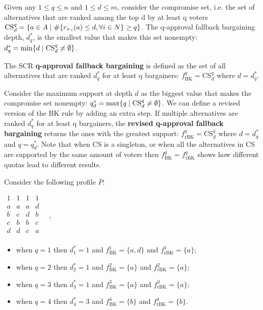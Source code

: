Given any $ 1 \leq q \leq n$ and $1 \leq d \leq m$, consider the compromise set, i.e. the set of alternatives that are ranked among the top d by at least q voters $\text{CS}^{q}_{d}=\{a \in A \suchthat \#\{r_{\prefi}(a) \leq d, \forall i \in N\} \geq q \}$.
The q-approval fallback bargaining depth, $d_{q}^{*}$, is the smallest value that makes this set nonempty: $d_{q}^{*}=\min\{d \suchthat \text{CS}^{q}_{d} \neq \emptyset\}$.

The \acs{SCR} \textbf{q-approval fallback bargaining} is defined as the set of all alternatives that are ranked $d_{q}^{*}$ for at least q bargainers: $f_{\text{BK}}^{q}=\text{CS}^{q}_{d}$ where $d=d_{q}^{*}$.

Consider the maximum support at depth $d$ as the biggest value that makes the compromise set nonempty: $q_{d}^{*}=\max\{q \suchthat \text{CS}^{q}_{d} \neq \emptyset\}$.
We can define a revised version of the BK rule by adding an extra step. If multiple alternatives are ranked $d_{q}^{*}$ for at least q bargainers, the \textbf{revised q-approval fallback bargaining} returns the ones with the greatest support: $f_{\text{rBK}}^{q}= \text{CS}^{q}_{d}$ where $d=d_{q}^{*}$ and $q=q_{d}^{*}$. 
Note that when CS is a singleton, or when all the alternatives in CS are supported by the same amount of voters then $f_{\text{BK}}^{q}=f_{\text{rBK}}^{q}$
 shows how different quotas lead to different results.

\begin{example}
	\label{ex:BK}
	Consider the following profile $P$:
	\begin{center}
		$
		\begin{array}{cccc}
			1 & 1 & 1 & 1 \\
			a &	a & a & d \\
			b &	c & d & b \\
			c &	b & b & c \\
			d &	d & c & a \\
		\end{array} \quad, 
		$
	\end{center}
	\begin{itemize}
		\itemsep0em
		\item [] when $q=1$ then $d_{1}^{*}=1$ and $f_{\text{BK}}^{1}=\{a,d\}$ and $f_{\text{rBK}}^{1}=\{a\}$;
		\item [] when $q=2$ then $d_{2}^{*}=1$ and $f_{\text{BK}}^{2}=\{a\}$ and $f_{\text{rBK}}^{2}=\{a\}$;
		\item [] when $q=3$ then $d_{3}^{*}=1$ and $f_{\text{BK}}^{3}=\{a\}$ and $f_{\text{rBK}}^{3}=\{a\}$;
		\item [] when $q=4$ then $d_{4}^{*}=3$ and $f_{\text{BK}}^{4}=\{b\}$ and $f_{\text{rBK}}^{4}=\{b\}$.
	\end{itemize}
\end{example}

